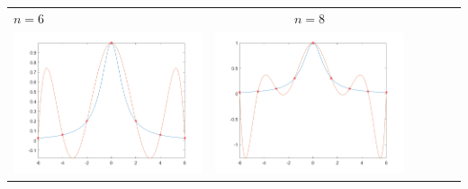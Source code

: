 \begin{tabular}{l*{5}{c}}
\hspace{3.5cm}\(n=6\)& \(n=8\) \\
\includegraphics[scale=0.5]{cap4/4_9/6.png} &  \includegraphics[scale=0.5]{cap4/4_9/8.png} \\


\end{tabular}
